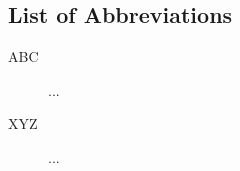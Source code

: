 \documentclass[crop=false]{standalone}
\begin{document}
\begin{multicols}
\section*{List of Abbreviations}
    \begin{description}
        \item[ABC] ...
        \item[XYZ] ...
    \end{description}
\end{multicols}
\end{document}
